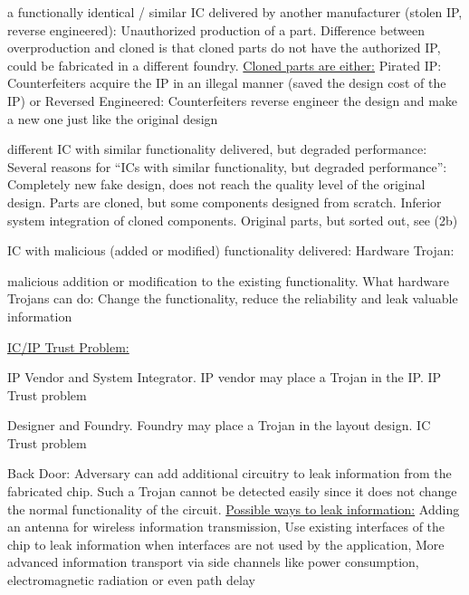 \documentclass[landscape, a4paper]{article}
\begin{document}
\begin{minipage}[t]{0.2\linewidth}
\begin{betterlist}
\begin{enumerate}
\begin{enumerate}[label=\color{PrimaryColor}\bfseries\alph*.]
			\end{enumerate}
			\item \alert{a functionally identical / similar IC delivered by another manufacturer (stolen IP, reverse engineered):} Unauthorized production of a part. \alert{Difference} between \alert{overproduction} and \alert{cloned} is that cloned parts do not have the authorized IP, could be fabricated in a different foundry. \underline{Cloned parts are either:} \alert{Pirated IP:} Counterfeiters acquire the IP in an illegal manner (saved the design cost of the IP) or \alert{Reversed Engineered:} Counterfeiters reverse engineer the design and make a new one just like the original design
			\item \alert{different IC with similar functionality delivered, but degraded performance:} Several reasons for \enquote{ICs with similar functionality, but degraded performance}: Completely new fake design, does not reach the quality level of the original design. Parts are cloned, but some components designed from scratch. Inferior system integration of cloned components. Original parts, but sorted out, see (2b)
			\item \alert{IC with malicious (added or modified) functionality delivered:} \alert{Hardware Trojan:}
			\end{betterlist}
		\end{enumerate}
	\end{betterlist}
\end{minipage}
\end{document}
